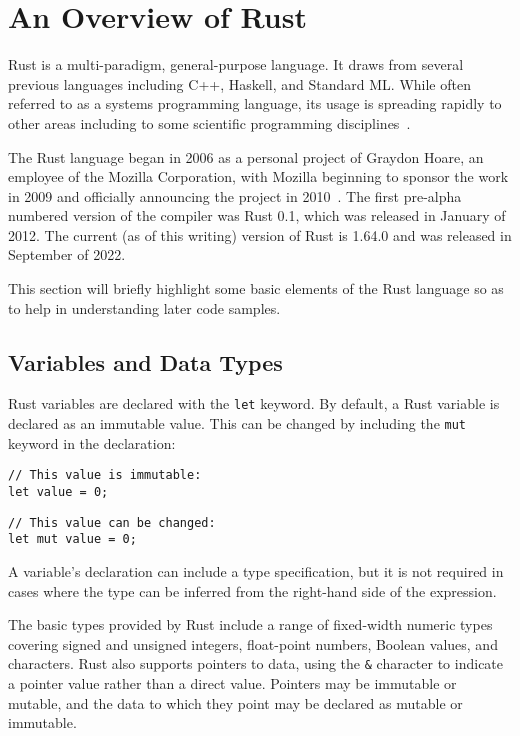 \section{An Overview of Rust}
\label{sec:rust}

Rust is a multi-paradigm, general-purpose language. It draws from several previous languages including C++, Haskell, and Standard ML. While often referred to as a systems programming language, its usage is spreading rapidly to other areas including to some scientific programming disciplines~\cite{nature.rust.2020}.

The Rust language began in 2006 as a personal project of Graydon Hoare, an employee of the Mozilla Corporation, with Mozilla beginning to sponsor the work in 2009 and officially announcing the project in 2010~\cite{asay.2021}. The first pre-alpha numbered version of the compiler was Rust 0.1, which was released in January of 2012. The current (as of this writing) version of Rust is 1.64.0 and was released in September of 2022.

This section will briefly highlight some basic elements of the Rust language so as to help in understanding later code samples.

\subsection{Variables and Data Types}

Rust variables are declared with the \texttt{let} keyword. By default, a Rust variable is declared as an immutable value. This can be changed by including the \texttt{mut} keyword in the declaration:

\begin{lstlisting}
// This value is immutable:
let value = 0;
\end{lstlisting}
\begin{lstlisting}
// This value can be changed:
let mut value = 0;
\end{lstlisting}

A variable's declaration can include a type specification, but it is not required in cases where the type can be inferred from the right-hand side of the expression.

The basic types provided by Rust include a range of fixed-width numeric types covering signed and unsigned integers, float-point numbers, Boolean values, and characters. Rust also supports pointers to data, using the \texttt{\&} character to indicate a pointer value rather than a direct value. Pointers may be immutable or mutable, and the data to which they point may be declared as mutable or immutable.

